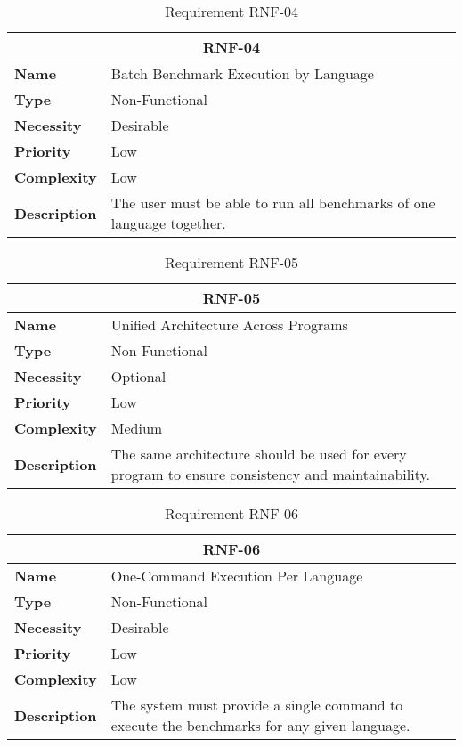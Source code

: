 \begin{table}[H]
    \centering
    \begin{tabular}{l p{10cm}}
        \toprule
        \multicolumn{2}{c}{\textbf{RNF-04}} \\
        \toprule
        \textbf{Name}               & Batch Benchmark Execution by Language \\
        \textbf{Type}               & Non-Functional \\
        \textbf{Necessity}          & Desirable \\
        \textbf{Priority}           & Low \\
        \textbf{Complexity}         & Low \\
        \textbf{Description}        & The user must be able to run all benchmarks of one language together. \\
        \bottomrule
    \end{tabular}
\caption{Requirement RNF-04}\label{tab:rnf-04}
\end{table}

\begin{table}[H]
    \centering
    \begin{tabular}{l p{10cm}}
        \toprule
        \multicolumn{2}{c}{\textbf{RNF-05}} \\
        \toprule
        \textbf{Name}         & Unified Architecture Across Programs \\
        \textbf{Type}         & Non-Functional \\
        \textbf{Necessity}    & Optional \\
        \textbf{Priority}     & Low \\
        \textbf{Complexity}   & Medium \\
        \textbf{Description}  & The same architecture should be used for every program to ensure consistency and maintainability. \\
        \bottomrule
    \end{tabular}
\caption{Requirement RNF-05}\label{tab:rnf-05}
\end{table}

\begin{table}[H]
    \centering
    \begin{tabular}{l p{10cm}}
        \toprule
        \multicolumn{2}{c}{\textbf{RNF-06}} \\
        \toprule
        \textbf{Name}         & One-Command Execution Per Language \\
        \textbf{Type}         & Non-Functional \\
        \textbf{Necessity}    & Desirable \\
        \textbf{Priority}     & Low \\
        \textbf{Complexity}   & Low \\
        \textbf{Description}  & The system must provide a single command to execute the benchmarks for any given language. \\
        \bottomrule
    \end{tabular}
\caption{Requirement RNF-06}\label{tab:rnf-06}
\end{table}

